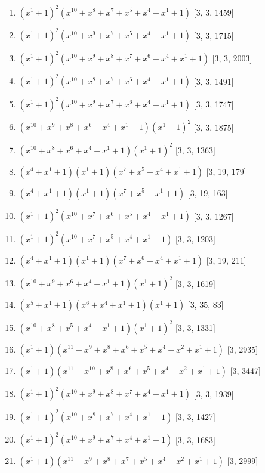 \documentclass[10pt,twocolumn]{article}
\begin{document}
\begin{enumerate}
\item $(x^{1} + 1)^{2}(x^{10} + x^{8} + x^{7} + x^{5} + x^{4} + x^{1} + 1)$  [3, 3, 1459]
\item $(x^{1} + 1)^{2}(x^{10} + x^{9} + x^{7} + x^{5} + x^{4} + x^{1} + 1)$  [3, 3, 1715]
\item $(x^{1} + 1)^{2}(x^{10} + x^{9} + x^{8} + x^{7} + x^{6} + x^{4} + x^{1} + 1)$  [3, 3, 2003]
\item $(x^{1} + 1)^{2}(x^{10} + x^{8} + x^{7} + x^{6} + x^{4} + x^{1} + 1)$  [3, 3, 1491]
\item $(x^{1} + 1)^{2}(x^{10} + x^{9} + x^{7} + x^{6} + x^{4} + x^{1} + 1)$  [3, 3, 1747]
\item $(x^{10} + x^{9} + x^{8} + x^{6} + x^{4} + x^{1} + 1)(x^{1} + 1)^{2}$  [3, 3, 1875]
\item $(x^{10} + x^{8} + x^{6} + x^{4} + x^{1} + 1)(x^{1} + 1)^{2}$  [3, 3, 1363]
\item $(x^{4} + x^{1} + 1)(x^{1} + 1)(x^{7} + x^{5} + x^{4} + x^{1} + 1)$  [3, 19, 179]
\item $(x^{4} + x^{1} + 1)(x^{1} + 1)(x^{7} + x^{5} + x^{1} + 1)$  [3, 19, 163]
\item $(x^{1} + 1)^{2}(x^{10} + x^{7} + x^{6} + x^{5} + x^{4} + x^{1} + 1)$  [3, 3, 1267]
\item $(x^{1} + 1)^{2}(x^{10} + x^{7} + x^{5} + x^{4} + x^{1} + 1)$  [3, 3, 1203]
\item $(x^{4} + x^{1} + 1)(x^{1} + 1)(x^{7} + x^{6} + x^{4} + x^{1} + 1)$  [3, 19, 211]
\item $(x^{10} + x^{9} + x^{6} + x^{4} + x^{1} + 1)(x^{1} + 1)^{2}$  [3, 3, 1619]
\item $(x^{5} + x^{1} + 1)(x^{6} + x^{4} + x^{1} + 1)(x^{1} + 1)$  [3, 35, 83]
\item $(x^{10} + x^{8} + x^{5} + x^{4} + x^{1} + 1)(x^{1} + 1)^{2}$  [3, 3, 1331]
\item $(x^{1} + 1)(x^{11} + x^{9} + x^{8} + x^{6} + x^{5} + x^{4} + x^{2} + x^{1} + 1)$  [3, 2935]
\item $(x^{1} + 1)(x^{11} + x^{10} + x^{8} + x^{6} + x^{5} + x^{4} + x^{2} + x^{1} + 1)$  [3, 3447]
\item $(x^{1} + 1)^{2}(x^{10} + x^{9} + x^{8} + x^{7} + x^{4} + x^{1} + 1)$  [3, 3, 1939]
\item $(x^{1} + 1)^{2}(x^{10} + x^{8} + x^{7} + x^{4} + x^{1} + 1)$  [3, 3, 1427]
\item $(x^{1} + 1)^{2}(x^{10} + x^{9} + x^{7} + x^{4} + x^{1} + 1)$  [3, 3, 1683]
\item $(x^{1} + 1)(x^{11} + x^{9} + x^{8} + x^{7} + x^{5} + x^{4} + x^{2} + x^{1} + 1)$  [3, 2999]

\end{enumerate}
\end{document}
